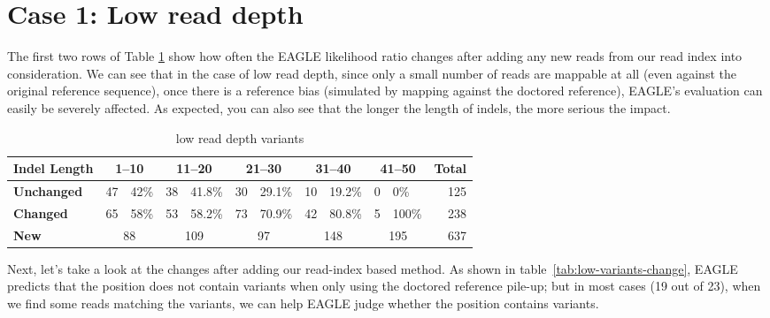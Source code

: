\section{Case 1: Low read depth}
The first two rows of Table \ref{tab:low-variants} show how often the EAGLE likelihood ratio changes after adding any new reads from our read index into consideration.
We can see that in the case of low read depth, since only a small number of reads are mappable at all (even against the original reference sequence), once there is a reference bias (simulated by mapping against the doctored reference), EAGLE's evaluation can easily be severely affected.  As expected, you can also see that the longer the length of indels, the more serious the impact.
\vspace{0.5cm}
\begin{table}[ht]
\center
\caption[low read depth variants]{low read depth variants}
\vspace{-0.5cm}
\begin{tabular}{|l|l|l|l|l|l|l|l|l|l|l|r|}
\hline
\textbf{Indel Length} & 
\multicolumn{2}{c|}{\textbf{1--10}}  & \multicolumn{2}{c|}{\textbf{11--20}}  & \multicolumn{2}{c|}{\textbf{21--30}}  &
\multicolumn{2}{c|}{\textbf{31--40}}  & \multicolumn{2}{c|}{\textbf{41--50}}   & 
\textbf{Total}\\\hline
\rowcolor{lightgray}
\textbf{Unchanged}  & 
47 & 42\%       &
38 & 41.8\%     &
30 & 29.1\%    &
10 & 19.2\%     &
0 & 0\%          &
125\\ \hline
\textbf{Changed} & 
65 & 58\%       &
53 & 58.2\%     & 
73 & 70.9\%    & 
42 & 80.8\%     &
5 & 100\%        &
238\\ \hline
\rowcolor{lightgray}    
\textbf{New}  & 
\multicolumn{2}{c|}{88}      &
\multicolumn{2}{c|}{109}     &
\multicolumn{2}{c|}{97}      &
\multicolumn{2}{c|}{148}    &
\multicolumn{2}{c|}{195}       & 
637\\ \hline
\end{tabular}
\label{tab:low-variants}
\end{table}

Next, let’s take a look at the changes after adding our read-index based method.  As shown in table~\ref{tab:low-variants-change}, EAGLE predicts that the position does not contain variants when only using the doctored reference pile-up; but in most cases (19 out of 23), when we find some reads matching the variants, we can help EAGLE judge whether the position contains variants. 

